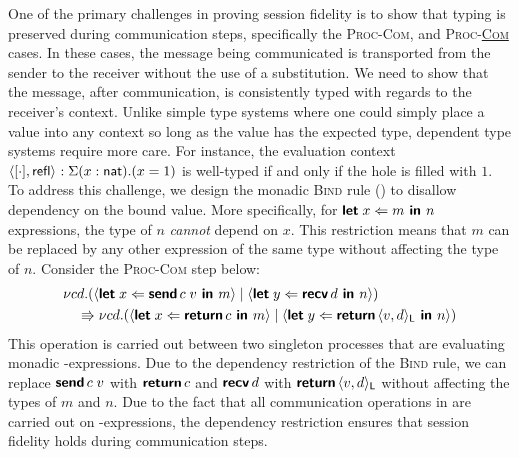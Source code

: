 One of the primary challenges in proving session fidelity is to show that typing
is preserved during communication steps, specifically the \textsc{Proc-Com}, and
\textsc{Proc-\underline{Com}} cases. In these cases, the message being
communicated is transported from the sender to the receiver without the use of a
substitution. We need to show that the message, after communication, is
consistently typed with regards to the receiver's context. Unlike simple type
systems where one could simply place a value into any context so long as
the value has the expected type, dependent type systems require more care. For
instance, the evaluation context $\langle{{[\cdot]},{\textsf{refl}}}\rangle_{} : \Sigma(x : \textsf{nat}).(x = 1)$ 
is well-typed if and only if the hole is filled with $1$. To address this challenge, 
we design the monadic \textsc{Bind} rule ()
to disallow dependency on the bound value. More specifically, for
$\textbf{\textsf{let}}\;{x}\Leftarrow{m}\textbf{\textsf{ in }}{n}$ expressions, the type of $n$ \emph{cannot} depend on $x$. This
restriction means that $m$ can be replaced by any other expression of the same
type without affecting the type of $n$. Consider the \textsc{Proc-Com} step below:
\begin{align*}
  &{\nu{cd}.{({\langle{\textbf{\textsf{let}}\;{x}\Leftarrow{{\textbf{\textsf{send}}\,{c}}\;{v}}\textbf{\textsf{ in }}{m}}\rangle} \mid {\langle{\textbf{\textsf{let}}\;{y}\Leftarrow{\textbf{\textsf{recv}}\,{d}}\textbf{\textsf{ in }}{n}}\rangle})}} \\
  &\quad\Rrightarrow {\nu{cd}.{({\langle{\textbf{\textsf{let}}\;{x}\Leftarrow{\textbf{\textsf{return}}\,{c}}\textbf{\textsf{ in }}{m}}\rangle} \mid {\langle{\textbf{\textsf{let}}\;{y}\Leftarrow{\textbf{\textsf{return}}\,{\langle{{v},{d}}\rangle_{\textsf{L}}}}\textbf{\textsf{ in }}{n}}\rangle})}}
\end{align*}
This operation is carried out between two singleton processes that are
evaluating monadic -expressions. Due to the dependency restriction of
the \textsc{Bind} rule, we can replace ${\textbf{\textsf{send}}\,{c}}\;{v}$ with $\textbf{\textsf{return}}\,{c}$
and $\textbf{\textsf{recv}}\,{d}$ with $\textbf{\textsf{return}}\,{\langle{{v},{d}}\rangle_{\textsf{L}}}$ without affecting the types of
$m$ and $n$. Due to the fact that all communication operations in \TLLC{} are
carried out on -expressions, the dependency restriction ensures that
session fidelity holds during communication steps.

